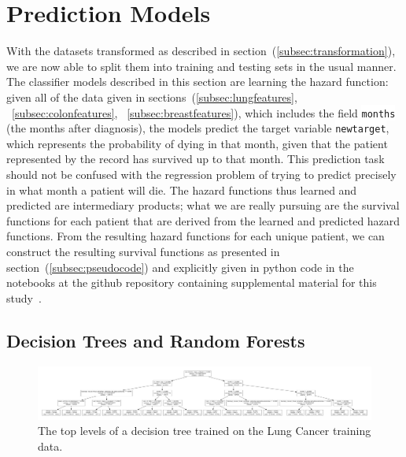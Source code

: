 \documentclass[a4paper,11pt]{article}
\newcommand{\codewhite}[1]{\colorbox{white}{\texttt{#1}}}
\begin{document}
\section{Prediction Models}

With the datasets transformed as described in section~(\ref{subsec:transformation}), we are now able to split them into training and testing sets in the usual manner.
The classifier models described in this section are learning the hazard function: given all of the data given in sections~(\ref{subsec:lungfeatures}, ~\ref{subsec:colonfeatures}, ~\ref{subsec:breastfeatures}), which includes the field \codewhite{months} (the months after diagnosis), the models predict the target variable \codewhite{newtarget}, which represents the probability of dying in that month, given that the patient represented by the record has survived up to that month. This prediction task should not be confused with the regression problem of trying to predict precisely in what month a patient will die.
The hazard functions thus learned and predicted are intermediary products; what we are really pursuing are the survival functions for each patient that are derived from the learned and predicted hazard functions.
From the resulting hazard functions for each unique patient, we can construct the
resulting survival functions as presented in section~(\ref{subsec:pseudocode}) and explicitly given in python code in the notebooks at the github repository containing supplemental material for this study~\cite{supp}.




\subsection{Decision Trees and Random Forests}

\begin{figure}
\centering 
\begin{center}
\includegraphics[width=.95\textwidth,origin=c]{lungdt.pdf}
\caption{\label{fig:lungdt} The top levels of a decision tree trained on the Lung Cancer training data.}
\end{center}
\end{figure}
\end{document}
